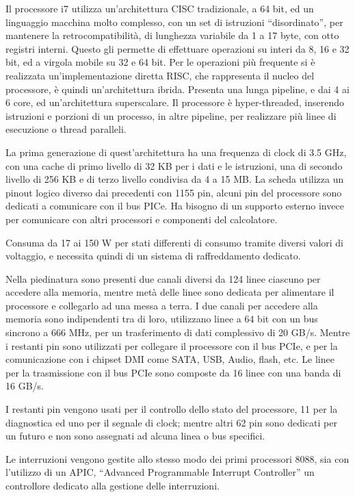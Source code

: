 \documentclass{article}
\numberwithin{equation}{subsection}
\begin{document}
Il processore i7 utilizza un'architettura CISC tradizionale, a 64 bit, ed un linguaggio macchina molto complesso, con un set di istruzioni ``disordinato'', per mantenere la 
retrocompatibilità, di lunghezza variabile da 1 a 17 byte, con otto registri interni. Questo gli permette di effettuare operazioni su interi da 8, 16 e 32 bit, ed a virgola mobile su 32 e 64 bit. 
Per le operazioni più frequente si è realizzata un'implementazione diretta RISC, che rappresenta il nucleo del processore, è quindi un'architettura ibrida. Presenta una lunga 
pipeline, e dai 4 ai 6 core, ed un'architettura superscalare. 
Il processore è hyper-threaded, inserendo istruzioni e porzioni di un processo, in altre pipeline, per realizzare più linee di esecuzione o thread paralleli. 

La prima generazione di quest'architettura ha una frequenza di clock di 3.5 GHz, con una cache di primo livello di 32 KB per i dati e le istruzioni, una di secondo livello di 256 KB e di 
terzo livello condivisa da 4 a 15 MB. 
La scheda utilizza un pinout logico diverso dai precedenti con 1155 pin, alcuni pin del processore sono dedicati a comunicare con il bus PICe. Ha bisogno di un supporto esterno invece per comunicare con altri processori e componenti del 
calcolatore. 

Consuma da 17 ai 150 W per stati differenti di consumo tramite diversi valori di voltaggio, e necessita quindi di un sistema di raffreddamento dedicato. 

Nella piedinatura sono presenti due canali diversi da 124 linee ciascuno per accedere alla memoria, mentre metà delle linee sono dedicata per alimentare il processore e collegarlo ad una 
messa a terra. 
I due canali per accedere alla memoria sono indipendenti tra di loro, utilizzano linee a 64 bit con un bus sincrono a 666 MHz, per un trasferimento di dati complessivo di 20 GB/s. 
Mentre i restanti pin sono utilizzati per collegare il processore con il bus PCIe, e per la comunicazione con i chipset DMI come SATA, USB, Audio, flash, etc. 
Le linee per la trasmissione con il bus PCIe sono composte da 16 linee con una banda di 16 GB/s. 

I restanti pin vengono usati per il controllo dello stato del processore, 11 per la diagnostica ed uno per il segnale di clock; mentre altri 62 pin sono dedicati per un futuro e non sono assegnati ad alcuna linea o bus 
specifici. 

Le interruzioni vengono gestite allo stesso modo dei primi processori 8088, sia con l'utilizzo di un APIC, ``Advanced Programmable Interrupt Controller'' un controllore dedicato alla 
gestione delle interruzioni. 
\end{document}
